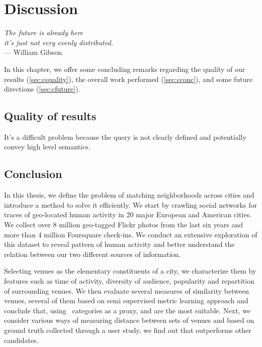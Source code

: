 \chapter{Discussion}
\label{chap:discussion}

\begin{flushright}{\slshape    
		The future is already here \\
		it's just not very evenly distributed.
    } \\ \medskip
    --- William Gibson
\end{flushright}

In this chapter, we offer some concluding remarks regarding the quality of our
results (\autoref{sec:cquality}), the overall work performed
(\autoref{sec:cconc}), and some future directions (\autoref{sec:cfuture}).

\section{Quality of results}
\label{sec:cquality}

It's a difficult problem because the query is not clearly defined and
potentially convey high level semantics.

\section{Conclusion}
\label{sec:cconc}

In this thesis, we define the problem of matching neighborhoods across cities
and introduce a method to solve it efficiently. We start by crawling social
networks for traces of geo-located human activity in 20 major European and
American cities. We collect over 8 million geo-tagged Flickr photos from the
last six years and more than 4 million Foursquare check-ins. We conduct an
extensive exploration of this dataset to reveal pattern of human activity and
better understand the relation between our two different sources of
information.

Selecting venues as the elementary constituents of a city, we characterize them
by features such as time of activity, diversity of audience, popularity and
repartition of surrounding venues. We then evaluate several measures of
similarity between venues, several of them based on semi supervised metric
learning approach and conclude that, using \fs\ categories as a proxy, \eucl{}
and \lmnn{} are the most suitable. Next, we consider various ways of measuring
distance between sets of venues and based on ground truth collected through a
user study, we find out that \emd{} outperforms other candidates.


